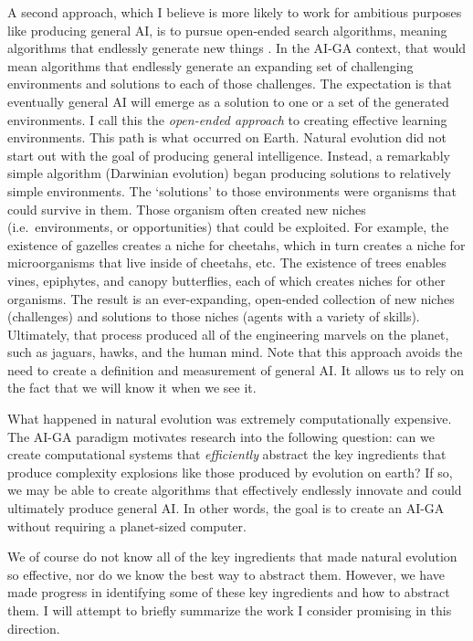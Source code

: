 \documentclass{article}
\begin{document}
A second approach, which I believe is more likely to work for ambitious purposes like producing general AI, is to pursue open-ended search algorithms, meaning algorithms that endlessly generate new things \cite{stanley:open}. In the AI-GA context, that would mean algorithms that endlessly generate an expanding set of challenging environments and solutions to each of those challenges. The expectation is that eventually general AI will emerge as a solution to one or a set of the generated environments. I call this the \emph{open-ended approach} to creating effective learning environments. This path is what occurred on Earth. Natural evolution did not start out with the goal of producing general intelligence. Instead, a remarkably simple algorithm (Darwinian evolution) began producing solutions to relatively simple environments. The `solutions' to those environments were organisms that could survive in them. Those organism often created new niches (i.e.\ environments, or opportunities) that could be exploited. For example, the existence of gazelles creates a niche for cheetahs, which in turn creates a niche for microorganisms that live inside of cheetahs, etc. The existence of trees enables vines, epiphytes, and canopy butterflies, each of which creates niches for other organisms. The result is an ever-expanding, open-ended collection of new niches (challenges) and solutions to those niches (agents with a variety of skills). Ultimately, that process produced all of the engineering marvels on the planet, such as jaguars, hawks, and the human mind. Note that this approach avoids the need to create a definition and measurement of general AI. It allows us to rely on the fact that we will know it when we see it.

What happened in natural evolution was extremely computationally expensive. The AI-GA paradigm motivates research into the following question: can we create computational systems that \emph{efficiently} abstract the key ingredients that produce complexity explosions like those produced by evolution on earth? If so, we may be able to create algorithms that effectively endlessly innovate and could ultimately produce general AI. In other words, the goal is to create an AI-GA without requiring a planet-sized computer.  

We of course do not know all of the key ingredients that made natural evolution so effective, nor do we know the best way to abstract them. However, we have made progress in identifying some of these key ingredients and how to abstract them. I will attempt to briefly summarize the work I consider promising in this direction. 
\end{document}
